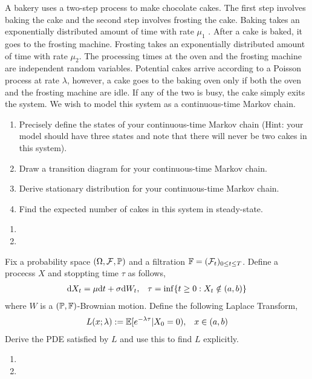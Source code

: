 \begin{problem}
A bakery uses a two-step process to make chocolate cakes. The first step involves baking the cake and the second step involves frosting the cake. Baking takes an exponentially distributed amount of time with rate \( \mu_1 \) . After a cake is baked, it goes to the frosting machine. Frosting takes an exponentially distributed amount of time with rate \( \mu_2 \). The processing times at the oven and the frosting machine are independent random variables. Potential cakes arrive according to a Poisson process at rate \( \lambda \), however, a cake goes to the baking oven only if both the oven and the frosting machine are idle. If any of the two is busy, the cake simply exits the system. We wish to model this system as a continuous-time Markov chain.
\begin{enumerate}[nolistsep,label=(\alph*)]
    \item Precisely define the states of your continuous-time Markov chain (Hint: your model should have three states and note that there will never be two cakes in this system).
    \item Draw a transition diagram for your continuous-time Markov chain.
    \item Derive stationary distribution for your continuous-time Markov chain.
    \item Find the expected number of cakes in this system in steady-state.
\end{enumerate}
\end{problem}

\begin{solution}[Solution]
\begin{enumerate}[label=(\alph*)]
    \item 
    \item 
\end{enumerate}
\end{solution}


\begin{problem}
    Fix a probability space \( (\Omega,\mathcal{F},\mathbb{P}) \) and a filtration \( \mathbb{F} = (\mathcal{F}_t)_{0\leq t\leq T} \). Define a procecss \( X \) and stoppting time \( \tau \) as follows,
    \begin{align*}
        \mathrm{d} X_t = \mu \mathrm{d} t + \sigma \mathrm{d} W_t, && \tau = \inf\{t\geq 0: X_t\notin(a,b)\}
    \end{align*}
    where \( W \) is a \( (\mathbb{P},\mathbb{F}) \)-Brownian motion. Define the following Laplace Transform,
    \begin{align*}
        L(x;\lambda) := \mathbb{E}[e^{-\lambda \tau} | X_0 = 0), && x\in(a,b)
    \end{align*}
    Derive the PDE satisfied by \( L \) and use this to find \( L \) explicitly.
\end{problem}

\begin{solution}[Solution]
\begin{enumerate}[label=(\alph*)]
    \item 
    \item 
\end{enumerate}
\end{solution}



